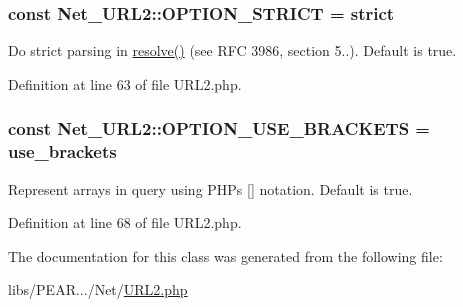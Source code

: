 \subsubsection[{O\+P\+T\+I\+O\+N\+\_\+\+S\+T\+R\+I\+C\+T}]{\setlength{\rightskip}{0pt plus 5cm}const Net\+\_\+\+U\+R\+L2\+::\+O\+P\+T\+I\+O\+N\+\_\+\+S\+T\+R\+I\+C\+T = \textquotesingle{}strict\textquotesingle{}}\label{classNet__URL2_a766955033bdccec7175d0694df62a1a9}
Do strict parsing in \hyperlink{classNet__URL2_a8630ab79fad624b2fd5b0df2e9123c0a}{resolve()} (see R\+F\+C 3986, section 5..). Default is true. 

Definition at line 63 of file U\+R\+L2.\+php.

\hypertarget{classNet__URL2_a864182f067e5df22055afc3a0dfe5a57}{}
\subsubsection[{O\+P\+T\+I\+O\+N\+\_\+\+U\+S\+E\+\_\+\+B\+R\+A\+C\+K\+E\+T\+S}]{\setlength{\rightskip}{0pt plus 5cm}const Net\+\_\+\+U\+R\+L2\+::\+O\+P\+T\+I\+O\+N\+\_\+\+U\+S\+E\+\_\+\+B\+R\+A\+C\+K\+E\+T\+S = \textquotesingle{}use\+\_\+brackets\textquotesingle{}}\label{classNet__URL2_a864182f067e5df22055afc3a0dfe5a57}
Represent arrays in query using P\+H\+P\textquotesingle{}s \mbox{[}\mbox{]} notation. Default is true. 

Definition at line 68 of file U\+R\+L2.\+php.



The documentation for this class was generated from the following file\+:\begin{DoxyCompactItemize}
\item 
libs/\+P\+E\+A\+R.../\+Net/\hyperlink{URL2_8php}{U\+R\+L2.\+php}\end{DoxyCompactItemize}

